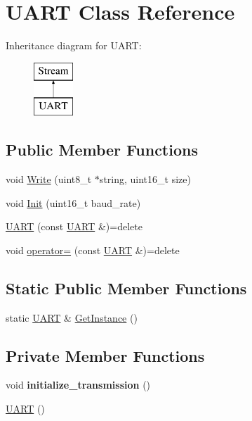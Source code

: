 \hypertarget{class_u_a_r_t}{}\section{U\+A\+RT Class Reference}
\label{class_u_a_r_t}
Inheritance diagram for U\+A\+RT\+:\begin{figure}[H]
\begin{center}
\leavevmode
\includegraphics[height=2.000000cm]{class_u_a_r_t}
\end{center}
\end{figure}
\subsection*{Public Member Functions}
\begin{DoxyCompactItemize}
\item 
void \hyperlink{class_u_a_r_t_a8bb77ca27b4e17d608d2743313625ac4}{Write} (uint8\+\_\+t $\ast$string, uint16\+\_\+t size)
\item 
void \hyperlink{class_u_a_r_t_aed659ee8bc31ba966144d1a522506a7b}{Init} (uint16\+\_\+t baud\+\_\+rate)
\item 
\hyperlink{class_u_a_r_t_a97debffc29b178c09b104f4542298a36}{U\+A\+RT} (const \hyperlink{class_u_a_r_t}{U\+A\+RT} \&)=delete
\item 
void \hyperlink{class_u_a_r_t_a843ab7fc20f5ce5f030d2ca5ee98d6b6}{operator=} (const \hyperlink{class_u_a_r_t}{U\+A\+RT} \&)=delete
\end{DoxyCompactItemize}
\subsection*{Static Public Member Functions}
\begin{DoxyCompactItemize}
\item 
static \hyperlink{class_u_a_r_t}{U\+A\+RT} \& \hyperlink{class_u_a_r_t_a745c8f35f3ca3ab6359cedda3e640777}{Get\+Instance} ()
\end{DoxyCompactItemize}
\subsection*{Private Member Functions}
\begin{DoxyCompactItemize}
\item 
\hypertarget{class_u_a_r_t_a195cdcca08c2ae1d03ee8bf13a87b95a}{}\label{class_u_a_r_t_a195cdcca08c2ae1d03ee8bf13a87b95a} 
void {\bfseries initialize\+\_\+transmission} ()
\item 
\hyperlink{class_u_a_r_t_a68e7e88d2a13f5da85f0fde1ef98515f}{U\+A\+RT} ()
\end{DoxyCompactItemize}
